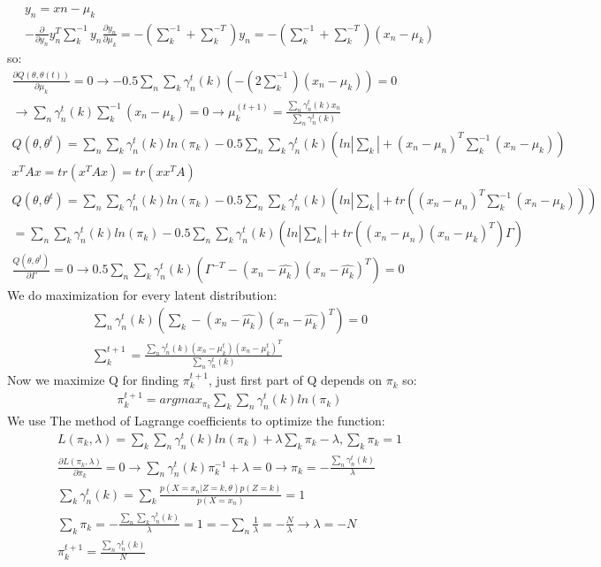 \documentclass[12pt]{article}
\begin{document}
\begin{qsolve}[solution]
\begin{gather*}
        y_n=xn-\mu_k \\
        -\frac{\partial}{\partial y_n}y_n^T\sum_k^{-1}y_n\frac{\partial y_n}{\partial\mu_k}=-(\sum_k^{-1}+\sum_k^{-T})y_n=-(\sum_k^{-1}+\sum_k^{-T})(x_n-\mu_k)
    \end{gather*}
    so:
    \begin{gather*}
        \frac{\partial Q(\theta,\theta(t))}{\partial \mu_k}=0\rightarrow-0.5\sum_n\sum_k\gamma_n^t(k)(-(2\sum_k^{-1})(x_n-\mu_k))=0 \\
        \rightarrow\sum_n\gamma_n^t(k)\sum_k^{-1}(x_n-\mu_k)=0\rightarrow\mu_k^{(t+1)}=\frac{\sum_n\gamma_n^t(k)x_n}{\sum_n\gamma_n^t(k)} \\
        Q(\theta,\theta^t)=\sum_n\sum_k\gamma_n^t(k)ln(\pi_k) -0.5\sum_n\sum_k\gamma_n^t(k)(ln|\sum_k|+(x_n-\mu_n)^T\sum_k^{-1}(x_n-\mu_k))
    \end{gather*}
    \splitqsolve
    \begin{gather*}
        x^TAx=tr(x^TAx)=tr(xx^TA) \\
        Q(\theta,\theta^t)=\sum_n\sum_k\gamma_n^t(k)ln(\pi_k)- 0.5\sum_n\sum_k\gamma_n^t(k)(ln|\sum_k|+tr((x_n-\mu_n)^T\sum_k^{-1}(x_n-\mu_k))) \\
        =\sum_n\sum_k\gamma_n^t(k)ln(\pi_k)- 0.5\sum_n\sum_k\gamma_n^t(k)(ln|\sum_k|+tr((x_n-\mu_n)(x_n-\mu_k)^T)\Gamma) \\
        \frac{Q(\theta,\theta^t)}{\partial\Gamma}=0\rightarrow0.5\sum_n\sum_k\gamma_n^t(k)(\Gamma^{-T}-(x_n-\hat{\mu_k})(x_n-\hat{\mu_k})^T)=0
    \end{gather*}
    We do maximization for every latent distribution:
    \begin{gather*}
        \sum_n\gamma_n^t(k)(\sum_k-(x_n-\hat{\mu_k})(x_n-\hat{\mu_k})^T)=0\\
        \sum_k^{t+1}=\frac{\sum_n\gamma_n^t(k)(x_n-\mu_k^t)(x_n-\mu_k^t)^T}{\sum_n\gamma_n^t(k)}
    \end{gather*}
    Now we maximize Q for finding $\pi_k^{t+1}$, just first part of Q depends on $\pi_k$ so:
    \begin{align*}
        \pi_k^{t+1}=argmax_{\pi_k}\sum_k\sum_n\gamma_n^t(k)ln(\pi_k)
    \end{align*}
    We use The method of Lagrange coefficients to optimize the function:
    \begin{gather*}
        L(\pi_k,\lambda)=\sum_k\sum_n\gamma_n^t(k)ln(\pi_k)+\lambda\sum_k\pi_k-\lambda,\sum_k\pi_k=1\\
        \frac{\partial L(\pi_k,\lambda)}{\partial\pi_k}=0\rightarrow\sum_{n}\gamma_n^t(k)\pi_k^{-1}+\lambda=0\rightarrow \pi_k=-\frac{\sum_n\gamma_n^t(k)}{\lambda}\\
        \sum_k\gamma_n^t(k)=\sum_k\frac{p(X=x_n|Z=k,\theta)p(Z=k)}{p(X=x_n)}=1\\
        \sum_k\pi_k=-\frac{\sum_n\sum_k\gamma_n^t(k)}{\lambda}=1=-\sum_n\frac{1}{\lambda}=-\frac{N}{\lambda}\rightarrow\lambda=-N \\
        \pi_k^{t+1}=\frac{\sum_n\gamma_n^t(k)}{N}
    \end{gather*}
\end{qsolve}
\clearpage
\end{document}
